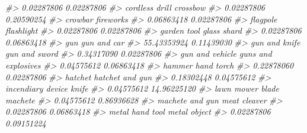 \documentclass[
]{krantz}
\makeatletter
\newenvironment{Shaded}{\begin{snugshade}}{\end{snugshade}}
\newcommand{\CommentTok}[1]{\textcolor[rgb]{0.37,0.37,0.37}{\textit{#1}}}
\newenvironment{kframe}{%
\medskip{}
\setlength{\fboxsep}{.8em}
 \def\at@end@of@kframe{}%
 \ifinner\ifhmode%
  \def\at@end@of@kframe{\end{minipage}}%
  \begin{minipage}{\columnwidth}%
 \fi\fi%
 \def\FrameCommand##1{\hskip\@totalleftmargin \hskip-\fboxsep
 \colorbox{shadecolor}{##1}\hskip-\fboxsep
     \hskip-\linewidth \hskip-\@totalleftmargin \hskip\columnwidth}%
 \MakeFramed {\advance\hsize-\width
   \@totalleftmargin\z@ \linewidth\hsize
   \@setminipage}}%
 {\par\unskip\endMakeFramed%
 \at@end@of@kframe}
\renewenvironment{Shaded}{\begin{kframe}}{\end{kframe}}
\makeatother
\begin{document}
\begin{Shaded}
\begin{Highlighting}[]
\CommentTok{\#\textgreater{}                       0.02287806                       0.02287806 }
\CommentTok{\#\textgreater{}                   cordless drill                         crossbow }
\CommentTok{\#\textgreater{}                       0.02287806                       0.20590254 }
\CommentTok{\#\textgreater{}                          crowbar                        fireworks }
\CommentTok{\#\textgreater{}                       0.06863418                       0.02287806 }
\CommentTok{\#\textgreater{}                         flagpole                       flashlight }
\CommentTok{\#\textgreater{}                       0.02287806                       0.02287806 }
\CommentTok{\#\textgreater{}                      garden tool                      glass shard }
\CommentTok{\#\textgreater{}                       0.02287806                       0.06863418 }
\CommentTok{\#\textgreater{}                              gun                      gun and car }
\CommentTok{\#\textgreater{}                      55.43353924                       0.11439030 }
\CommentTok{\#\textgreater{}                    gun and knife                    gun and sword }
\CommentTok{\#\textgreater{}                       0.34317090                       0.02287806 }
\CommentTok{\#\textgreater{}                  gun and vehicle              guns and explosives }
\CommentTok{\#\textgreater{}                       0.04575612                       0.06863418 }
\CommentTok{\#\textgreater{}                           hammer                       hand torch }
\CommentTok{\#\textgreater{}                       0.22878060                       0.02287806 }
\CommentTok{\#\textgreater{}                          hatchet                  hatchet and gun }
\CommentTok{\#\textgreater{}                       0.18302448                       0.04575612 }
\CommentTok{\#\textgreater{}                incendiary device                            knife }
\CommentTok{\#\textgreater{}                       0.04575612                      14.96225120 }
\CommentTok{\#\textgreater{}                 lawn mower blade                          machete }
\CommentTok{\#\textgreater{}                       0.04575612                       0.86936628 }
\CommentTok{\#\textgreater{}                  machete and gun                     meat cleaver }
\CommentTok{\#\textgreater{}                       0.02287806                       0.06863418 }
\CommentTok{\#\textgreater{}                  metal hand tool                     metal object }
\CommentTok{\#\textgreater{}                       0.02287806                       0.09151224 }

\end{Highlighting}
\end{Shaded}
\end{document}
